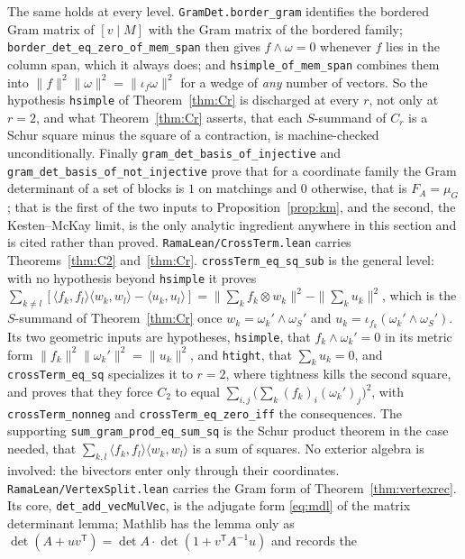 \documentclass[11pt]{article}
\theoremstyle{remark}
\begin{document}
The same holds at every level. \texttt{GramDet.border\_gram} identifies the bordered Gram
matrix of $[v\mid M]$ with the Gram matrix of the bordered family;
\texttt{border\_det\_eq\_zero\_of\_mem\_span} then gives $f\wedge\omega=0$ whenever $f$
lies in the column span, which it always does; and \texttt{hsimple\_of\_mem\_span} combines
them into $\|f\|^2\|\omega\|^2=\|\iota_f\omega\|^2$ for a wedge of \emph{any} number of
vectors. So the hypothesis \texttt{hsimple} of Theorem~\ref{thm:Cr} is discharged at every
$r$, not only at $r=2$, and what Theorem~\ref{thm:Cr} asserts, that each $S$-summand of
$C_r$ is a Schur square minus the square of a contraction, is machine-checked
unconditionally. Finally \texttt{gram\_det\_basis\_of\_injective} and
\texttt{gram\_det\_basis\_of\_not\_injective} prove that for a coordinate family the Gram
determinant of a set of blocks is $1$ on matchings and $0$ otherwise, that is
$F_A=\mu_G$; that is the first of the two inputs to Proposition~\ref{prop:km}, and the
second, the Kesten--McKay limit, is the only analytic ingredient anywhere in this section
and is cited rather than proved.
\texttt{RamaLean/CrossTerm.lean} carries Theorems~\ref{thm:C2} and~\ref{thm:Cr}.
\texttt{crossTerm\_eq\_sq\_sub} is the general level: with no hypothesis beyond
\texttt{hsimple} it proves
$\sum_{k\ne l}[\langle f_k,f_l\rangle\langle w_k,w_l\rangle-\langle u_k,u_l\rangle]
=\|\sum_kf_k\otimes w_k\|^2-\|\sum_ku_k\|^2$, which is the $S$-summand of
Theorem~\ref{thm:Cr} once $w_k=\omega_k'\wedge\omega_S'$ and
$u_k=\iota_{f_k}(\omega_k'\wedge\omega_S')$. Its two geometric
inputs are hypotheses, \texttt{hsimple}, that $f_k\wedge\omega_k'=0$ in its metric form
$\|f_k\|^2\|\omega_k'\|^2=\|u_k\|^2$, and \texttt{htight}, that $\sum_ku_k=0$, and
\texttt{crossTerm\_eq\_sq} specializes it to $r=2$, where tightness kills the second
square, and proves that they force $C_2$ to equal
$\sum_{i,j}\bigl(\sum_k(f_k)_i(\omega_k')_j\bigr)^2$, with \texttt{crossTerm\_nonneg} and
\texttt{crossTerm\_eq\_zero\_iff} the consequences. The supporting
\texttt{sum\_gram\_prod\_eq\_sum\_sq} is the Schur product theorem in the case needed,
that $\sum_{k,l}\langle f_k,f_l\rangle\langle w_k,w_l\rangle$ is a sum of squares. No
exterior algebra is involved: the bivectors enter only through their coordinates.
\texttt{RamaLean/VertexSplit.lean} carries the Gram form of
Theorem~\ref{thm:vertexrec}. Its core, \texttt{det\_add\_vecMulVec}, is the adjugate
form \eqref{eq:mdl} of the matrix determinant lemma; Mathlib has the lemma only as
$\det(A+uv^{\mathsf T})=\det A\cdot\det(1+v^{\mathsf T}A^{-1}u)$ and records the
\end{document}
